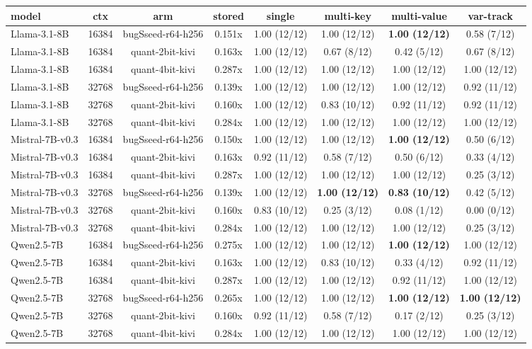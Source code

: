 \begin{tabular}{lccccccc}
\toprule
model & ctx & arm & stored & single & multi-key & multi-value & var-track \\
\midrule
Llama-3.1-8B & 16384 & bugSseed-r64-h256 & 0.151x & 1.00 (12/12) & 1.00 (12/12) & \textbf{1.00 (12/12)} & 0.58 (7/12) \\
Llama-3.1-8B & 16384 & quant-2bit-kivi & 0.163x & 1.00 (12/12) & 0.67 (8/12) & 0.42 (5/12) & 0.67 (8/12) \\
Llama-3.1-8B & 16384 & quant-4bit-kivi & 0.287x & 1.00 (12/12) & 1.00 (12/12) & 1.00 (12/12) & 1.00 (12/12) \\
Llama-3.1-8B & 32768 & bugSseed-r64-h256 & 0.139x & 1.00 (12/12) & 1.00 (12/12) & 1.00 (12/12) & 0.92 (11/12) \\
Llama-3.1-8B & 32768 & quant-2bit-kivi & 0.160x & 1.00 (12/12) & 0.83 (10/12) & 0.92 (11/12) & 0.92 (11/12) \\
Llama-3.1-8B & 32768 & quant-4bit-kivi & 0.284x & 1.00 (12/12) & 1.00 (12/12) & 1.00 (12/12) & 1.00 (12/12) \\
Mistral-7B-v0.3 & 16384 & bugSseed-r64-h256 & 0.150x & 1.00 (12/12) & 1.00 (12/12) & \textbf{1.00 (12/12)} & 0.50 (6/12) \\
Mistral-7B-v0.3 & 16384 & quant-2bit-kivi & 0.163x & 0.92 (11/12) & 0.58 (7/12) & 0.50 (6/12) & 0.33 (4/12) \\
Mistral-7B-v0.3 & 16384 & quant-4bit-kivi & 0.287x & 1.00 (12/12) & 1.00 (12/12) & 1.00 (12/12) & 0.25 (3/12) \\
Mistral-7B-v0.3 & 32768 & bugSseed-r64-h256 & 0.139x & 1.00 (12/12) & \textbf{1.00 (12/12)} & \textbf{0.83 (10/12)} & 0.42 (5/12) \\
Mistral-7B-v0.3 & 32768 & quant-2bit-kivi & 0.160x & 0.83 (10/12) & 0.25 (3/12) & 0.08 (1/12) & 0.00 (0/12) \\
Mistral-7B-v0.3 & 32768 & quant-4bit-kivi & 0.284x & 1.00 (12/12) & 1.00 (12/12) & 1.00 (12/12) & 0.25 (3/12) \\
Qwen2.5-7B & 16384 & bugSseed-r64-h256 & 0.275x & 1.00 (12/12) & 1.00 (12/12) & \textbf{1.00 (12/12)} & 1.00 (12/12) \\
Qwen2.5-7B & 16384 & quant-2bit-kivi & 0.163x & 1.00 (12/12) & 0.83 (10/12) & 0.33 (4/12) & 0.92 (11/12) \\
Qwen2.5-7B & 16384 & quant-4bit-kivi & 0.287x & 1.00 (12/12) & 1.00 (12/12) & 0.92 (11/12) & 1.00 (12/12) \\
Qwen2.5-7B & 32768 & bugSseed-r64-h256 & 0.265x & 1.00 (12/12) & 1.00 (12/12) & \textbf{1.00 (12/12)} & \textbf{1.00 (12/12)} \\
Qwen2.5-7B & 32768 & quant-2bit-kivi & 0.160x & 0.92 (11/12) & 0.58 (7/12) & 0.17 (2/12) & 0.25 (3/12) \\
Qwen2.5-7B & 32768 & quant-4bit-kivi & 0.284x & 1.00 (12/12) & 1.00 (12/12) & 1.00 (12/12) & 1.00 (12/12) \\
\bottomrule
\end{tabular}
